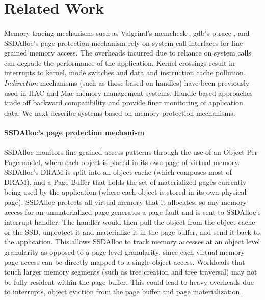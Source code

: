 \section{Related Work}
\label{sec:related}
\paragraph{}
Memory tracing mechanisms such as Valgrind's memcheck \cite{nethercote2007valgrind}, gdb's ptrace \cite{gdb}, and SSDAlloc's \cite{SSDAlloc} page protection mechanism rely on system call interfaces for fine grained memory access. The overheads incurred due to reliance on system calls can degrade the performance of the application. Kernel crossings result in interrupts to kernel, mode switches and data and instruction cache pollution. {\emph{Indirection}} mechanisms (such as those based on handles) have been previously used in HAC \cite{castro1997hac} and Mac memory management systems. Handle based approaches trade off backward compatibility and provide finer monitoring of application data. We next describe systems based on memory protection mechanisms.

\paragraph{SSDAlloc's page protection mechanism}
SSDAlloc monitors fine grained access patterns through the use of an Object Per Page model, where each object is placed in its own page of virtual memory. SSDAlloc's DRAM is split into an object cache (which composes most of DRAM), and a Page Buffer that holds the set of materialized pages currently being used by the application (where each object is stored in its own physical page). SSDAlloc protects all virtual memory that it allocates, so any memory access for an unmaterialized page generates a page fault and is sent to SSDAlloc's interrupt handler. The handler would then pull the object from the object cache or the SSD, unprotect it and materialize it in the page buffer, and send it back to the application. This allows SSDAlloc to track memory accesses at an object level granularity as opposed to a page level granularity, since each virtual memory page access can be directly mapped to a single object access. Workloads that touch larger memory segments (such as tree creation and tree traversal) may not be fully resident within the page buffer. This could lead to heavy overheads due to interrupts, object eviction from the page buffer and page materialization.

